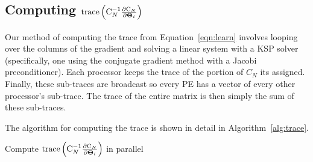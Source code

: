 \subsection{Computing $\text{trace}\left(\mathrm{C}_{N}^{-1} \frac{\partial
      \mathrm{C}_N}{\partial {\boldsymbol \Theta}_i}\right)$}
\label{sub:trace}

Our method of computing the trace from Equation~\ref{eqn:learn} involves looping over the
columns of the gradient and solving a linear system with a \ac{KSP} solver (specifically,
one using the conjugate gradient method with a Jacobi preconditioner).  Each processor
keeps the trace of the portion of $C_N$ its assigned.  Finally, these sub-traces are
broadcast so every \ac{PE} has a vector of every other processor's sub-trace.  The trace
of the entire matrix is then simply the sum of these sub-traces.

The algorithm for computing the trace is shown in detail in Algorithm~\ref{alg:trace}.

\begin{algorithm}
  \caption{Compute $\text{trace}\left(\mathrm{C}_{N}^{-1} \frac{\partial
      \mathrm{C}_N}{\partial {\boldsymbol \Theta}_i}\right)$ in parallel}
  \label{alg:trace}
    \begin{algorithmic}[1]
      \EndIf
      \EndFor
      \State {}
      \State {}
    \end{algorithmic}
\end{algorithm}


